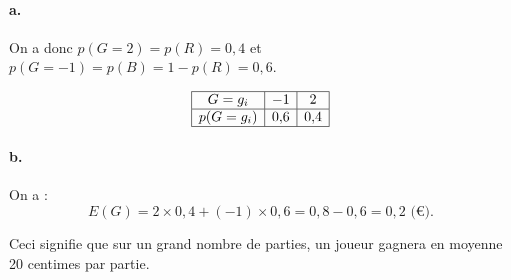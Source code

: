 \documentclass[10pt]{article}
\begin{document}
\paragraph{a.} On a donc \(p(G = 2) = p(R) = 0{,}4\) et \(p(G = -1) = p(B) = 1 - p(R) = 0{,}6\).

\[
\begin{array}{|c|c|c|}
\hline
G = g_i & -1 & 2 \\
\hline
p(G = g_i) & 0{,}6 & 0{,}4 \\
\hline
\end{array}
\]

\paragraph{b.} On a :
\[
E(G) = 2 \times 0{,}4 + (-1) \times 0{,}6 = 0{,}8 - 0{,}6 = 0{,}2 \text{ (€)}.
\]

Ceci signifie que sur un grand nombre de parties, un joueur gagnera en moyenne 20 centimes par partie.
\end{document}
